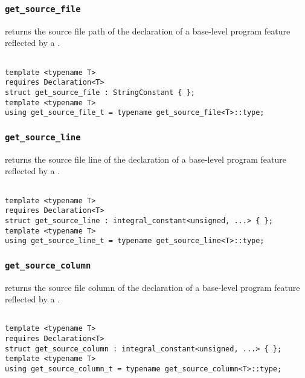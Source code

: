 
\subsubsection{\texttt{get\_source\_file}}

returns the source file path of the declaration of a base-level program feature reflected by a .

\begin{verbatim}

template <typename T>
requires Declaration<T>
struct get_source_file : StringConstant { };
template <typename T>
using get_source_file_t = typename get_source_file<T>::type;

\end{verbatim}

\subsubsection{\texttt{get\_source\_line}}

returns the source file line of the declaration of a base-level program feature reflected by a .

\begin{verbatim}

template <typename T>
requires Declaration<T>
struct get_source_line : integral_constant<unsigned, ...> { };
template <typename T>
using get_source_line_t = typename get_source_line<T>::type;

\end{verbatim}

\subsubsection{\texttt{get\_source\_column}}

returns the source file column of the declaration of a base-level program feature reflected by a .

\begin{verbatim}

template <typename T>
requires Declaration<T>
struct get_source_column : integral_constant<unsigned, ...> { };
template <typename T>
using get_source_column_t = typename get_source_column<T>::type;

\end{verbatim}
